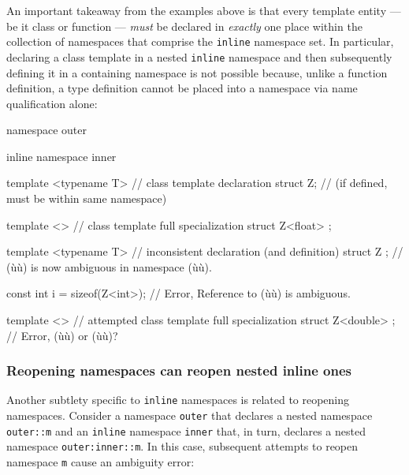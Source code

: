 \noindent An important takeaway from the examples above is that every template
entity --- be it class or function --- \emph{must} be declared
in \emph{exactly} one place within the collection of namespaces that
comprise the \lstinline!inline! namespace set. In particular, declaring a
class template in a nested \lstinline!inline! namespace and then
subsequently defining it in a containing namespace is not possible
because, unlike a function definition, a type definition cannot be
placed into a namespace via name qualification alone:

\begin{emcppslisting}[emcppserrorlines={17}]
namespace outer
{
    inline namespace inner
    {
        template <typename T>      // class template declaration
        struct Z;                  // (if defined, must be within same namespace)

        template <>                // class template full specialization
        struct Z<float> { };
    }

    template <typename T>          // inconsistent declaration (and definition)
    struct Z { };                  // (ù{}ù) is now ambiguous in namespace (ù{}ù).

    const int i = sizeof(Z<int>);  // Error, Reference to (ù{}ù) is ambiguous.

    template <>                    // attempted class template full specialization
    struct Z<double> { };          // Error, (ù{}ù) or (ù{}ù)?
}
\end{emcppslisting}
    

\subsubsection[Reopening namespaces can reopen nested \lstinline!inline! ones]{Reopening namespaces can reopen nested {\SubsubsecCode inline} ones}\label{reopening-namespaces-can-reopen-nested-inline-ones}

Another subtlety specific to \lstinline!inline! namespaces is related to
reopening namespaces. Consider a namespace \lstinline!outer! that declares
a nested namespace \lstinline!outer::m! and an \lstinline!inline!
namespace \lstinline!inner! that, in turn, declares a nested namespace
\lstinline!outer:inner::m!. In this case, subsequent attempts to reopen
namespace \lstinline!m! cause an ambiguity error:

